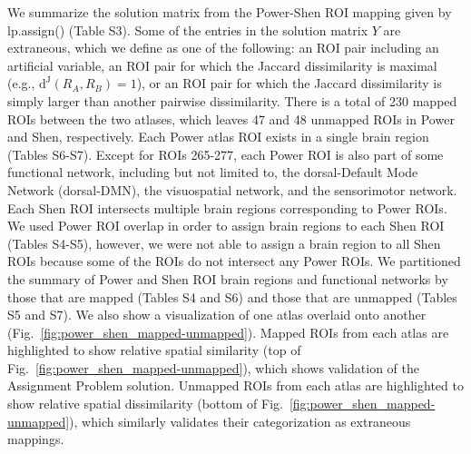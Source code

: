 \documentclass[10pt,letterpaper]{article}\usepackage[]{graphicx}\usepackage[]{color}
\begin{document}
We summarize the solution matrix from the Power-Shen ROI mapping given by \textsf{lp.assign()} (Table S3). Some of the entries in the solution matrix $Y$ are extraneous, which we define as one of the following: an ROI pair including an artificial variable, an ROI pair for which the Jaccard dissimilarity is maximal (e.g., $\text{d}^\text{J}(R_A,R_B)=1$), or an ROI pair for which the Jaccard dissimilarity is simply larger than another pairwise dissimilarity. There is a total of 230 mapped ROIs between the two atlases, which leaves 47 and 48 unmapped ROIs in Power and Shen, respectively. Each Power atlas ROI exists in a single brain region (Tables S6-S7). Except for ROIs 265-277, each Power ROI is also part of some functional network, including but not limited to, the dorsal-Default Mode Network (dorsal-DMN), the visuospatial network, and the sensorimotor network. Each Shen ROI intersects multiple brain regions corresponding to Power ROIs. We used Power ROI overlap in order to assign brain regions to each Shen ROI (Tables S4-S5), however, we were not able to assign a brain region to all Shen ROIs because some of the ROIs do not intersect any Power ROIs. We partitioned the summary of Power and Shen ROI brain regions and functional networks by those that are mapped (Tables S4 and S6) and those that are unmapped (Tables S5 and S7). We also show a visualization of one atlas overlaid onto another (Fig.~\ref{fig:power_shen_mapped-unmapped}). Mapped ROIs from each atlas are highlighted to show relative spatial similarity (top of Fig.~\ref{fig:power_shen_mapped-unmapped}), which shows validation of the Assignment Problem solution. Unmapped ROIs from each atlas are highlighted to show relative spatial dissimilarity (bottom of Fig.~\ref{fig:power_shen_mapped-unmapped}), which similarly validates their categorization as extraneous mappings.

\end{document}
